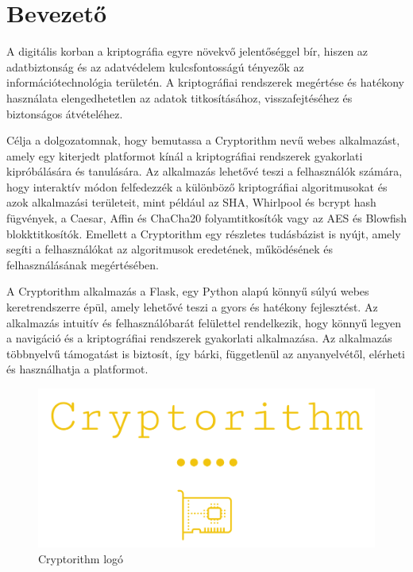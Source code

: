 \chapter{Bevezető}%

A digitális korban a kriptográfia egyre növekvő jelentőséggel bír, hiszen az adatbiztonság és az adatvédelem kulcsfontosságú tényezők az információtechnológia területén. A kriptográfiai rendszerek megértése és hatékony használata elengedhetetlen az adatok titkosításához, visszafejtéséhez és biztonságos átvételéhez.

Célja a dolgozatomnak, hogy bemutassa a Cryptorithm nevű webes alkalmazást, amely egy kiterjedt platformot kínál a kriptográfiai rendszerek gyakorlati kipróbálására és tanulására. Az alkalmazás lehetővé teszi a felhasználók számára, hogy interaktív módon felfedezzék a különböző kriptográfiai algoritmusokat és azok alkalmazási területeit, mint például az SHA, Whirlpool és bcrypt hash fügvények, a Caesar, Affin és ChaCha20 folyamtitkosítók vagy az AES és Blowfish blokktitkosítók. Emellett a Cryptorithm egy részletes tudásbázist is nyújt, amely segíti a felhasználókat az algoritmusok eredetének, működésének és felhasználásának megértésében.

A Cryptorithm alkalmazás a Flask, egy Python alapú könnyű súlyú webes keretrendszerre épül, amely lehetővé teszi a gyors és hatékony fejlesztést. Az alkalmazás intuitív és felhasználóbarát felülettel rendelkezik, hogy könnyű legyen a navigáció és a kriptográfiai rendszerek gyakorlati alkalmazása. Az alkalmazás többnyelvű támogatást is biztosít, így bárki, függetlenül az anyanyelvétől, elérheti és használhatja a platformot.

\begin{figure}[!h]
	\centering
	\includegraphics[scale=0.25]{images/logoCryptorithm}
	\caption{Cryptorithm logó}
\end{figure}
\pagebreak

